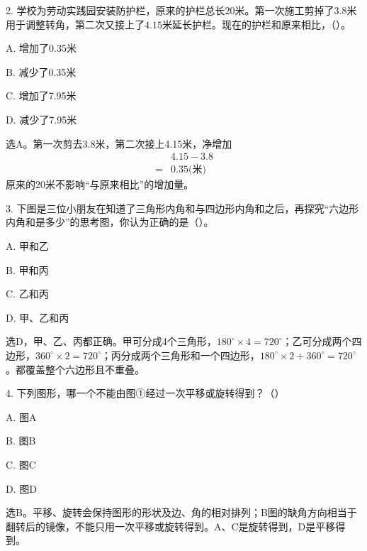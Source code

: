 2. 学校为劳动实践园安装防护栏，原来的护栏总长\(20\)米。第一次施工剪掉了\(3.8\)米用于调整转角，第二次又接上了\(4.15\)米延长护栏。现在的护栏和原来相比，（\hspace{1.8em}）。\par
\noindent A. 增加了0.35米\par
\noindent B. 减少了0.35米\par
\noindent C. 增加了7.95米\par
\noindent D. 减少了7.95米\par
\begin{BookAnswer}
选A。第一次剪去3.8米，第二次接上4.15米，净增加\[\begin{aligned} &4.15-3.8\\ ={}&0.35\text{(米)}\end{aligned}\]原来的20米不影响“与原来相比”的增加量。
\end{BookAnswer}

3. 下图是三位小朋友在知道了三角形内角和与四边形内角和之后，再探究“六边形内角和是多少”的思考图，你认为正确的是（\hspace{1.8em}）。\par
\noindent A. 甲和乙\par
\noindent B. 甲和丙\par
\noindent C. 乙和丙\par
\noindent D. 甲、乙和丙\par
{}
\begin{BookAnswer}
选D，甲、乙、丙都正确。甲可分成4个三角形，\allowbreak{}\(180^\circ\times4=720^\circ\)；乙可分成两个四边形，\allowbreak{}\(360^\circ\times2=720^\circ\)；丙分成两个三角形和一个四边形，\allowbreak{}\(180^\circ\times2+360^\circ=720^\circ\)。都覆盖整个六边形且不重叠。
\end{BookAnswer}

4. 下列图形，哪一个不能由图①经过一次平移或旋转得到？（\hspace{1.8em}）\par
\noindent A. 图A\par
\noindent B. 图B\par
\noindent C. 图C\par
\noindent D. 图D\par
{}
\begin{BookAnswer}
选B。平移、旋转会保持图形的形状及边、角的相对排列；B图的缺角方向相当于翻转后的镜像，不能只用一次平移或旋转得到。A、C是旋转得到，D是平移得到。
\end{BookAnswer}

